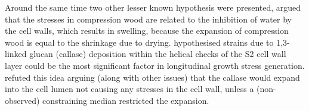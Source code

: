 Around the same time two other lesser known hypothesis were presented, \citet{hejnowicz1967some} argued that the stresses in compression
wood are related to the inhibition of water by the cell walls, which results in
swelling, because the expansion of compression wood is equal to the shrinkage
due to drying. \citet{brodzki1972} hypothesised strains due to 1,3-linked glucan (callase)
deposition within the helical checks of the S2 cell wall layer could be the
most significant factor in longitudinal growth stress generation. \citet{boyd1977basic}
refuted this idea arguing (along with other issues) that the callase would
expand into the cell lumen not causing any stresses in the cell wall, unless a
(non-observed) constraining median restricted the expansion.